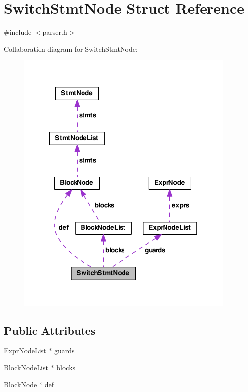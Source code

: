 \hypertarget{struct_switch_stmt_node}{\section{Switch\-Stmt\-Node Struct Reference}
\label{struct_switch_stmt_node}
}


{\ttfamily \#include $<$parser.\-h$>$}



Collaboration diagram for Switch\-Stmt\-Node\-:
\nopagebreak
\begin{figure}[H]
\begin{center}
\leavevmode
\includegraphics[width=302pt]{struct_switch_stmt_node__coll__graph}
\end{center}
\end{figure}
\subsection*{Public Attributes}
\begin{DoxyCompactItemize}
\item 
\hyperlink{struct_expr_node_list}{Expr\-Node\-List} $\ast$ \hyperlink{struct_switch_stmt_node_a125319a6fd02d72d96d41193daffb4a2}{guards}
\item 
\hyperlink{struct_block_node_list}{Block\-Node\-List} $\ast$ \hyperlink{struct_switch_stmt_node_a6cdb5c66044261b28302b6ca682d7564}{blocks}
\item 
\hyperlink{struct_block_node}{Block\-Node} $\ast$ \hyperlink{struct_switch_stmt_node_ad75de1632a46c451d251959e56d53d44}{def}
\end{DoxyCompactItemize}


